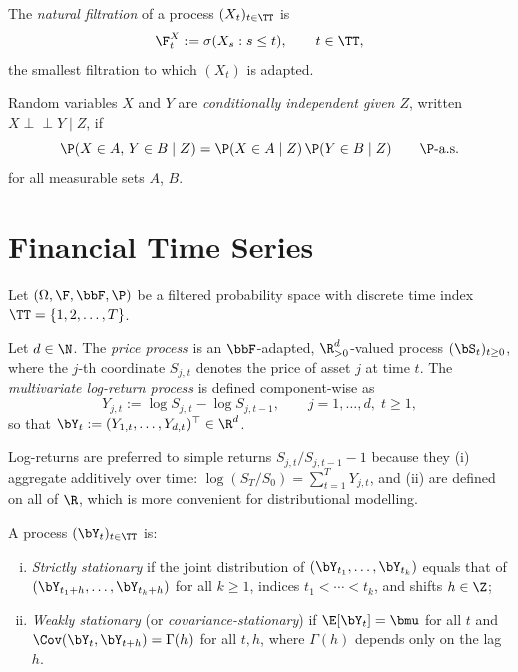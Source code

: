 \begin{definition}
\label{def:natural_filtration}
The \emph{natural filtration} of a process $(X_t)_{t\in\TT}$ is
\[
  \F_t^X := \sigma(X_s : s \le t), \qquad t\in\TT,
\]
the smallest filtration to which $(X_t)$ is adapted.
\end{definition}

\begin{definition}
\label{def:cond_indep}
Random variables $X$ and $Y$ are \emph{conditionally independent given $Z$},
written $X\perp\!\!\!\perp Y \mid Z$, if
\[
  \P(X\in A,\, Y\in B \mid Z) = \P(X\in A\mid Z)\,\P(Y\in B\mid Z)
  \qquad \P\text{-a.s.}
\]
for all measurable sets $A$, $B$.
\end{definition}

\section{Financial Time Series}
\label{sec:fin_ts}

Let $(\Omega,\F,\bbF,\P)$ be a filtered probability space with discrete time
index $\TT=\{1,2,\ldots,T\}$.

\begin{definition}
\label{def:returns}
Let $d\in\N$.  The \emph{price process} is an $\bbF$-adapted,
$\R^d_{>0}$-valued process $(\bS_t)_{t\ge 0}$, where the $j$-th coordinate
$S_{j,t}$ denotes the price of asset $j$ at time $t$.  The
\emph{multivariate log-return process} is defined component-wise as
\[
  Y_{j,t} := \log S_{j,t} - \log S_{j,t-1},
  \qquad j=1,\ldots,d,\; t\ge 1,
\]
so that $\bY_t := (Y_{1,t},\ldots,Y_{d,t})^\top \in\R^d$.
\end{definition}

Log-returns are preferred to simple returns $S_{j,t}/S_{j,t-1}-1$ because
they (i) aggregate additively over time:
$\log(S_T/S_0) = \sum_{t=1}^T Y_{j,t}$, and (ii) are defined on all of
$\R$, which is more convenient for distributional modelling.

\begin{definition}
\label{def:stationarity}
A process $(\bY_t)_{t\in\TT}$ is:
\begin{enumerate}[(i)]
  \item \emph{Strictly stationary} if the joint distribution of
        $(\bY_{t_1},\ldots,\bY_{t_k})$ equals that of
        $(\bY_{t_1+h},\ldots,\bY_{t_k+h})$ for all
        $k\ge 1$, indices $t_1<\cdots<t_k$, and shifts $h\in\Z$;
  \item \emph{Weakly stationary} (or \emph{covariance-stationary}) if
        $\E[\bY_t]=\bmu$ for all $t$ and
        $\Cov(\bY_t,\bY_{t+h})=\Gamma(h)$ for all $t,h$, where
        $\Gamma(h)$ depends only on the lag $h$.
\end{enumerate}
\end{definition}

